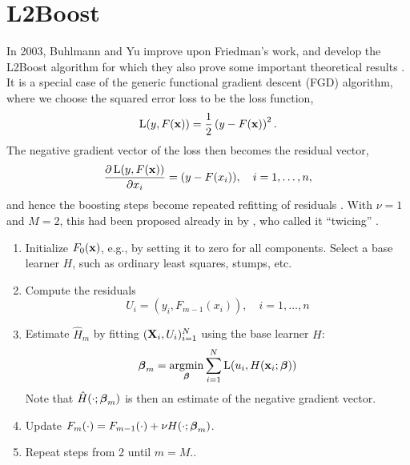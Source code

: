 \section{L2Boost}
In 2003, Buhlmann and Yu improve upon Friedman's work, and develop the L2Boost algorithm for which they also prove some important theoretical results \citep{buhlmann-yu}. It is a special case of the generic functional gradient descent (FGD) algorithm, where we choose the squared error loss to be the loss function,
\begin{equation*}
    \operatorname{L}(y,F(\mathbf{x}))=\frac{1}{2}\left(y-F(\mathbf{x})\right)^2.
\end{equation*}
The negative gradient vector of the loss then becomes the residual vector,
\begin{equation*}
    \frac{\partial\operatorname{L}(y,F(\mathbf{x}))}{\partial x_i}=(y-F(x_i)),\quad i=1,\dotsc,n,
\end{equation*}
and hence the boosting steps become repeated refitting of residuals \citep{friedman2001,buhlmann-yu}. With $\nu=1$ and $M=2$, this had been proposed already in \citeyear{tukey} by \citeauthor{tukey}, who called it ``twicing'' \citep{tukey}.
\begin{enumerate}
    \item Initialize $F_0(\mathbf{x})$, e.g., by setting it to zero for all components. Select a base learner $H$, such as ordinary least squares, stumps, etc.
    \item Compute the residuals
        \begin{equation*}
            U_i=(y_i,F_{m-1}(x_i)),\quad i=1,\dotsc,n
        \end{equation*}
    \item Estimate $\hat{H}_m$ by fitting $(\mathbf{X}_i,U_i)_{i=1}^N$ using the base learner $H$:
        \begin{equation*}
            \boldsymbol{\beta}_m=\operatorname*{argmin}_{\boldsymbol{\beta}}\sum_{i=1}^N\operatorname{L}(u_i,H(\mathbf{x}_i;\boldsymbol{\beta}))
        \end{equation*}
        Note that $\hat{H}(\cdot;\boldsymbol{\beta}_m)$ is then an estimate of the negative gradient vector.
    \item Update $F_m(\cdot)=F_{m-1}(\cdot)+\nu H(\cdot;\boldsymbol{\beta}_m)$.
    \item Repeat steps from 2 until $m=M$..
\end{enumerate}
